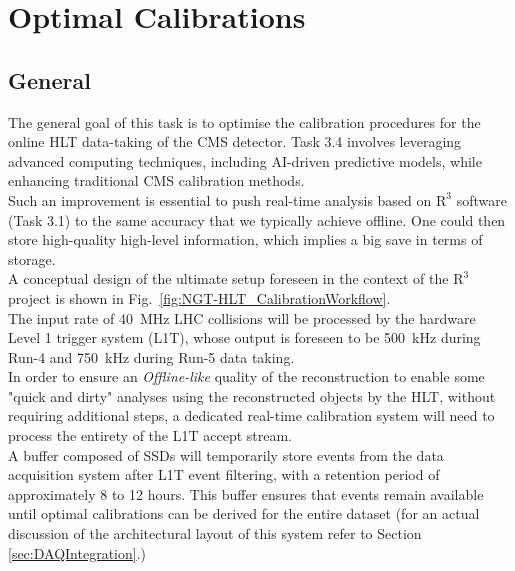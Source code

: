 \chapter{Optimal Calibrations} \label{sec:OpCa_HLT}
\section{General} %

The general goal of this task is to optimise the calibration procedures for the online HLT data-taking of the CMS detector. Task 3.4 involves leveraging advanced computing techniques, including AI-driven predictive models, while enhancing traditional CMS calibration methods. \\
Such an improvement is essential to push real-time analysis based on $\mathrm{R}^3$ software (Task 3.1) to the same accuracy that we typically achieve offline. One could then store high-quality high-level information, which implies a big save in terms of storage.\\
\newline
A conceptual design of the ultimate setup foreseen in the context of the $\mathrm{R}^3$  project is shown in  Fig.~\ref{fig:NGT-HLT_CalibrationWorkflow}. \\
The input rate of \SI{40}{\mega\hertz} LHC collisions will be processed by the hardware Level 1 trigger system (L1T), whose output is foreseen to be \SI{500}{\kilo\hertz} during Run-\num{4} and \SI{750}{\kilo\hertz} during Run-\num{5} data taking. \\
\newline
In order to ensure an \emph{Offline-like} quality of the reconstruction to enable some "quick and dirty" analyses using the reconstructed objects by the HLT, without requiring additional steps, a dedicated real-time calibration system will need to process the entirety of the L1T accept stream.\\  
A buffer composed of SSDs will temporarily store events from the data acquisition system after L1T event filtering, with a retention period of approximately 8 to 12 hours. This buffer ensures that events remain available until optimal calibrations can be derived for the entire dataset (for an actual discussion of the architectural layout of this system refer to Section \ref{sec:DAQIntegration}.)\\
\newline

